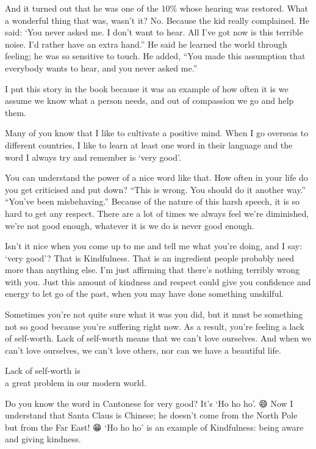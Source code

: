 \documentclass[12pt, openany]{book}
\newenvironment{aphorism}%
{%
\begin{center}\begin{itshape}
}%
{\end{itshape}\end{center}
}%
\begin{document}
And it turned out that he was one of the 10\% whose hearing was restored. What a wonderful thing that was, wasn’t it? No. Because the kid really complained. He said: ‘You never asked me. I don’t want to hear. All I’ve got now is this terrible noise. I’d rather have an extra hand.” He said he learned the world through feeling; he was so sensitive to touch. He added, “You made this assumption that everybody wants to hear, and you never asked me.” 

I put this story in the book because it was an example of how often it is we assume we know what a person needs, and out of compassion we go and help them. 

Many of you know that I like to cultivate a positive mind. When I go overseas to different countries, I like to learn at least one word in their language and the word I always try and remember is ‘very good’. 

You can understand the power of a nice word like that. How often in your life do you get criticised and put down? “This is wrong. You should do it another way.” “You’ve been misbehaving.” Because of the nature of this harsh speech, it is so hard to get any respect. There are a lot of times we always feel we’re diminished, we’re not good enough, whatever it is we do is never good enough. 

Isn’t it nice when you come up to me and tell me what you’re doing, and I say: ‘very good’? That is Kindfulness. That is an ingredient people probably need more than anything else. I’m just affirming that there’s nothing terribly wrong with you. Just this amount of kindness and respect could give you confidence and energy to let go of the past, when you may have done something unskilful. 

Sometimes you’re not quite sure what it was you did, but it must be something not so good because you’re suffering right now. As a result, you’re feeling a lack of self-worth. Lack of self-worth means that we can’t love ourselves. And when we can’t love ourselves, we can’t love others, nor can we have a beautiful life. 

\begin{aphorism}
Lack of self-worth is\\  
a great problem in our modern world.
\end{aphorism}

Do you know the word in Cantonese for very good? It’s ‘Ho ho ho’. 😄 Now I understand that Santa Claus is Chinese; he doesn’t come from the North Pole but from the Far East! 😁 ‘Ho ho ho’ is an example of Kindfulness: being aware and giving kindness. 
\end{document}
